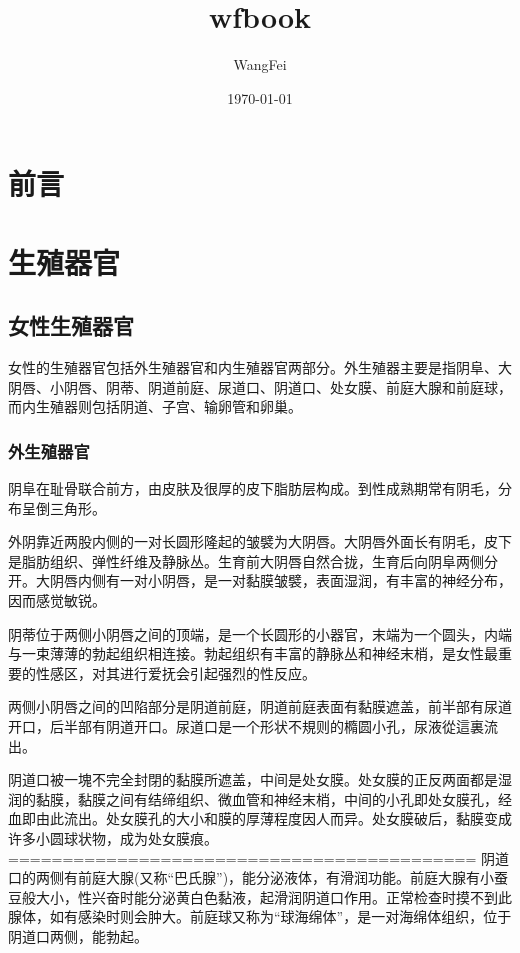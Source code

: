 \documentclass[12pt,UTF8]{ctexbook}
\title{\heiti\zihao{0} wfbook}
\author{WangFei}
\date{\today}
\begin{document}
\maketitle
\tableofcontents

\frontmatter

\chapter{前言}



\mainmatter

\chapter{生殖器官}

\section{女性生殖器官}

女性的生殖器官包括外生殖器官和内生殖器官两部分。外生殖器主要是指阴阜、大阴唇、小阴唇、阴蒂、阴道前庭、尿道口、阴道口、处女膜、前庭大腺和前庭球，而内生殖器则包括阴道、子宫、输卵管和卵巢。

\subsection{外生殖器官}

阴阜在耻骨联合前方，由皮肤及很厚的皮下脂肪层构成。到性成熟期常有阴毛，分布呈倒三角形。

外阴靠近两股内侧的一对长圆形隆起的皱襞为大阴唇。大阴唇外面长有阴毛，皮下是脂肪组织、弹性纤维及静脉丛。生育前大阴唇自然合拢，生育后向阴阜两侧分开。大阴唇内侧有一对小阴唇，是一对黏膜皱襞，表面湿润，有丰富的神经分布，因而感觉敏锐。

阴蒂位于两侧小阴唇之间的顶端，是一个长圆形的小器官，末端为一个圆头，内端与一束薄薄的勃起组织相连接。勃起组织有丰富的静脉丛和神经末梢，是女性最重要的性感区，对其进行爱抚会引起强烈的性反应。

两侧小阴唇之间的凹陷部分是阴道前庭，阴道前庭表面有黏膜遮盖，前半部有尿道开口，后半部有阴道开口。尿道口是一个形状不規则的橢圆小孔，尿液從這裏流出。

阴道口被一塊不完全封閉的黏膜所遮盖，中间是处女膜。处女膜的正反两面都是湿润的黏膜，黏膜之间有结缔组织、微血管和神经末梢，中间的小孔即处女膜孔，经血即由此流出。处女膜孔的大小和膜的厚薄程度因人而异。处女膜破后，黏膜变成许多小圆球状物，成为处女膜痕。
===========================================
阴道口的两侧有前庭大腺(又称“巴氏腺”)，能分泌液体，有滑润功能。前庭大腺有小蚕豆般大小，性兴奋时能分泌黄白色黏液，起滑润阴道口作用。正常检查时摸不到此腺体，如有感染时则会肿大。前庭球又称为“球海绵体”，是一对海绵体组织，位于阴道口两侧，能勃起。
\end{document}
